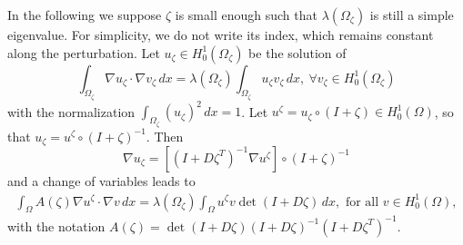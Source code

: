 \documentclass[JEP,XML,SOM,Unicode,ThmDefs,NoFloatCountersInSection,published]{cedram}
\theoremstyle{plain}
\theoremstyle{definition}
\begin{document}
In the following we suppose $\zeta$ is small enough such that $\lambda(\Omega_\zeta)$ is still a simple eigenvalue. For simplicity, we do not write its index, which remains constant along the perturbation. Let $u_\zeta \in H_0^1(\Omega_\zeta)$ be the solution of
\begin{equation}
\int_{\Omega_\zeta} \nabla u_\zeta \cdot \nabla v_\zeta \, dx= \lambda (\Omega_\zeta) \int_{\Omega_\zeta} u_\zeta v_\zeta \,dx, \ \forall v_\zeta \in H_0^1(\Omega_\zeta)
\label{eq:eig-problem-moved}
\end{equation}
with the normalization $\int_{\Omega_\zeta} (u_\zeta)^2\, dx = 1$. Let $u^\zeta = u_\zeta\circ (I+\zeta)\in H_0^1(\Omega)$, so that $u_\zeta = u^\zeta\circ(I+\zeta)^{-1}$. Then
\begin{equation}
\nabla u_\zeta = [(I+D\zeta^T)^{-1}\nabla u^\zeta ] \circ (I+\zeta)^{-1}
\label{eq:change-var-grad}
\end{equation}
and a change of variables leads to
\begin{eqnarray}
\int_\Omega A(\zeta) \nabla u^\zeta \cdot \nabla v \,dx = \lambda(\Omega_\zeta) \int_\Omega u^\zeta v \det(I+D\zeta) \,dx, \text{ for all } v \in H_0^1(\Omega),
\label{eq:eig-problem-fixed}
\end{eqnarray}
with the notation $A(\zeta) = \det(I+D\zeta)(I+D\zeta)^{-1}(I+D\zeta^T)^{-1}$.
\end{document}
